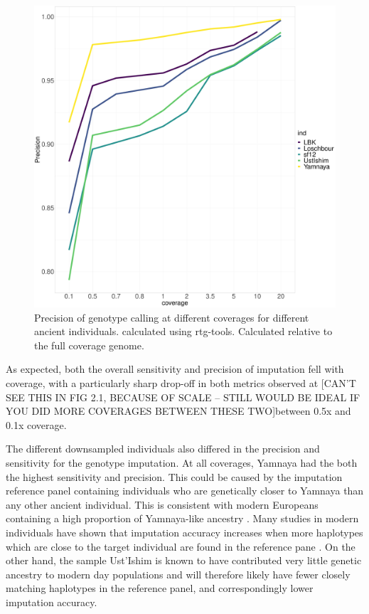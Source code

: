 \begin{figure}[htp]
    \centering
    \includegraphics[width=1.0\textwidth]{../images/chapter1/allDownsampled_rtgtools_Precision.pdf}
    \caption{Precision of genotype calling at different coverages for different ancient individuals.  calculated using rtg-tools. Calculated relative to the full coverage genome.}
    \label{fig:precision_downsampled_rtgtools}
\end{figure}

As expected, both the overall sensitivity and precision of imputation fell with coverage, with a particularly sharp drop-off in both metrics observed at {\color{red}[CAN'T SEE THIS IN FIG 2.1, BECAUSE OF SCALE -- STILL WOULD BE IDEAL IF YOU DID MORE COVERAGES BETWEEN THESE TWO]between 0.5x and 0.1x coverage.}

The different downsampled individuals also differed in the precision and sensitivity for the genotype imputation. At all coverages, Yamnaya had the both the highest sensitivity and precision. This could be caused by the imputation reference panel containing individuals who are genetically closer to Yamnaya than any other ancient individual. This is consistent with modern Europeans containing a high proportion of Yamnaya-like ancestry \cite{Haak2005}. Many studies in modern individuals have shown that imputation accuracy increases when more haplotypes which are close to the target individual are found in the reference pane \cite{HUANG2009235, delaneau2018integrative}. On the other hand, the sample Ust'Ishim is known to have contributed very little genetic ancestry to modern day populations \cite{Prufer2014} and will therefore likely have fewer closely matching haplotypes in the reference panel, and correspondingly lower imputation accuracy. 

